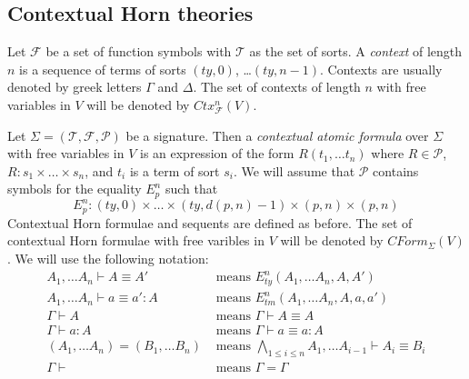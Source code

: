 \documentclass[reqno]{amsart}
\theoremstyle{definition}
\theoremstyle{remark}
\newcommand{\deq}{\equiv}
\numberwithin{figure}{section}
\begin{document}
\subsection{Contextual Horn theories}

Let $\mathcal{F}$ be a set of function symbols with $\mathcal{T}$ as the set of sorts.
A \emph{context} of length $n$ is a sequence of terms of sorts $(ty,0)$, \ldots $(ty,n-1)$.
Contexts are usually denoted by greek letters $\Gamma$ and $\Delta$.
The set of contexts of length $n$ with free variables in $V$ will be denoted by $Ctx^n_\mathcal{F}(V)$.

Let $\Sigma = (\mathcal{T}, \mathcal{F}, \mathcal{P})$ be a signature.
Then a \emph{contextual atomic formula} over $\Sigma$ with free variables in $V$ is an expression of the form 
$R(t_1, \ldots t_n)$ where $R \in \mathcal{P}$, $R : s_1 \times \ldots \times s_n$, and $t_i$ is a term of sort $s_i$.
We will assume that $\mathcal{P}$ contains symbols for the equality $E^n_p$ such that
\[ E^n_p : (ty,0) \times \ldots \times (ty,d(p,n)-1) \times (p,n) \times (p,n) \]
Contextual Horn formulae and sequents are defined as before.
The set of contextual Horn formulae with free varibles in $V$ will be denoted by $CForm_\Sigma(V)$.
We will use the following notation:
\begin{align*}
A_1, \ldots A_n \vdash A \deq A' & \text{ means } E^n_{ty}(A_1, \ldots A_n, A, A') \\
A_1, \ldots A_n \vdash a \deq a' : A & \text{ means } E^n_{tm}(A_1, \ldots A_n, A, a, a') \\
\Gamma \vdash A & \text{ means } \Gamma \vdash A \deq A \\
\Gamma \vdash a : A & \text{ means } \Gamma \vdash a \deq a : A \\
(A_1, \ldots A_n) = (B_1, \ldots B_n) & \text{ means } \bigwedge\limits_{1 \leq i \leq n} A_1, \ldots A_{i-1} \vdash A_i \equiv B_i \\
\Gamma \vdash & \text{ means } \Gamma = \Gamma
\end{align*}
\end{document}
